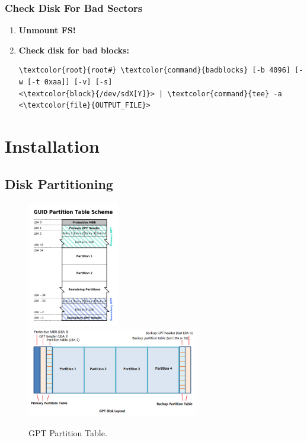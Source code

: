 \documentclass[10pt, a4paper, onecolumn, oneside, titlepage, openany]{book}
\begin{document}
\subsection{Check Disk For Bad Sectors}
\begin{enumerate}
    \item \textbf{Unmount FS!}
    \item \textbf{Check disk for bad blocks:}
\begin{Verbatim}[commandchars=\\\{\}]
\textcolor{root}{root#} \textcolor{command}{badblocks} [-b 4096] [-w [-t 0xaa]] [-v] [-s]
<\textcolor{block}{/dev/sdX[Y]}> | \textcolor{command}{tee} -a <\textcolor{file}{OUTPUT_FILE}>
\end{Verbatim}
\end{enumerate}


\chapter{Installation}
\section{Disk Partitioning}
\begin{figure}[ht]
    \begin{center}
        \includegraphics[width=40mm]{./src/img/gpt1.png}
        \includegraphics[width=75mm]{./src/img/gpt2.png}
        \caption{GPT Partition Table.}
        \label{fig:1}
    \end{center}
\end{figure}
\end{document}
